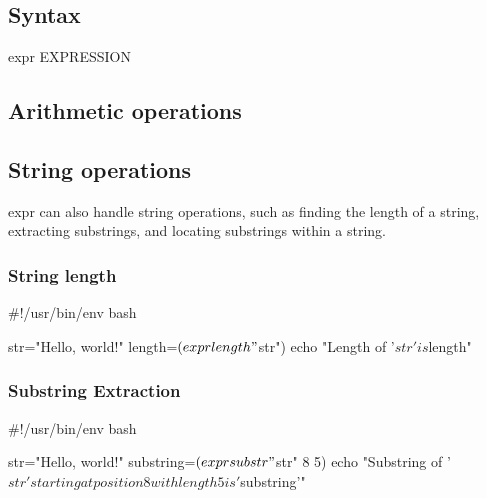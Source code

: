 \documentclass{report}
\begin{document}
    \subsection{Syntax}
    \bigbreak \noindent 
    \begin{bashcode}
    expr EXPRESSION
    \end{bashcode}
    \bigbreak \noindent 
    \subsection{Arithmetic operations}
    \bigbreak \noindent 

    \bigbreak \noindent 
    \subsection{String operations}
    \bigbreak \noindent 
    expr can also handle string operations, such as finding the length of a string, extracting substrings, and locating substrings within a string.
    \bigbreak \noindent 
    \subsubsection{String length}
    \bigbreak \noindent 
    \begin{bashcode}
    #!/usr/bin/env bash

    str="Hello, world!"
    length=$(expr length "$str")
    echo "Length of '$str' is $length"
    \end{bashcode}
    \bigbreak \noindent 
    \subsubsection{Substring Extraction}
    \bigbreak \noindent 
    \begin{bashcode}
    #!/usr/bin/env bash

    str="Hello, world!"
    substring=$(expr substr "$str" 8 5)
    echo "Substring of '$str' starting at position 8 with length 5 is '$substring'"
    \end{bashcode}
\end{document}
